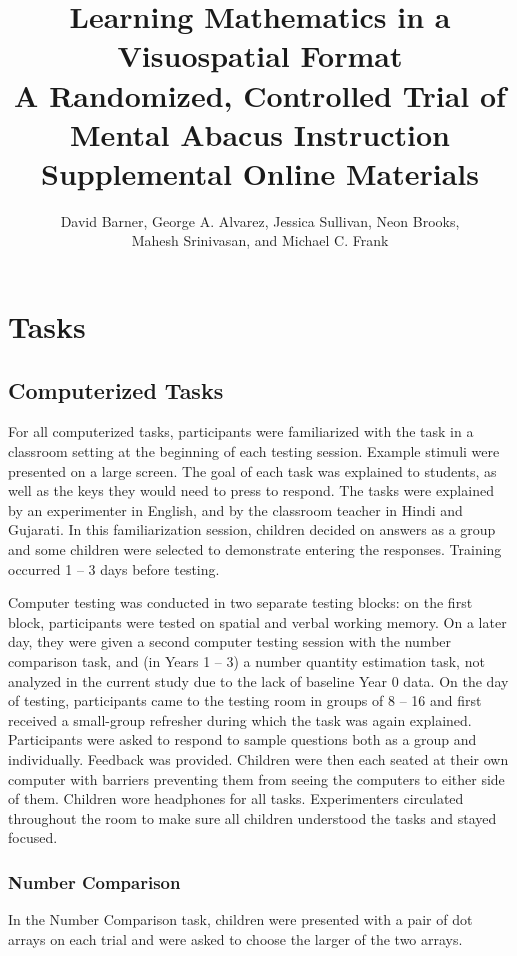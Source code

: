 \documentclass[11pt]{article}
\title{Learning Mathematics in a Visuospatial Format\\A Randomized, Controlled Trial of Mental Abacus Instruction\\Supplemental Online Materials}
\author{David Barner, George A. Alvarez, Jessica Sullivan, Neon Brooks, \\ Mahesh Srinivasan, and Michael C. Frank}
\date{}
\begin{document}
\maketitle
\tableofcontents
\newpage

\section{Tasks}

\subsection{Computerized Tasks}

For all computerized tasks, participants were familiarized with the task in a classroom setting at the beginning of each testing session. Example stimuli were presented on a large screen. The goal of each task was explained to students, as well as the keys they would need to press to respond. The tasks were explained by an experimenter in English, and by the classroom teacher in Hindi and Gujarati. In this familiarization session, children decided on answers as a group and some children were selected to demonstrate entering the responses. Training occurred 1 -- 3 days before testing.

Computer testing was conducted in two separate testing blocks: on the first block, participants were tested on spatial and verbal working memory. On a later day, they were given a second computer testing session with the number comparison task, and (in Years 1 -- 3) a number quantity estimation task, not analyzed in the current study due to the lack of baseline Year 0 data. On the day of testing, participants came to the testing room in groups of 8 -- 16 and first received a small-group refresher during which the task was again explained.  Participants were asked to respond to sample questions both as a group and individually. Feedback was provided. Children were then each seated at their own computer with barriers preventing them from seeing the computers to either side of them. Children wore headphones for all tasks. Experimenters circulated throughout the room to make sure all children understood the tasks and stayed focused.

\subsubsection{Number Comparison}

In the Number Comparison task, children were presented with a pair of dot arrays on each trial and were asked to choose the larger of the two arrays.
\end{document}
